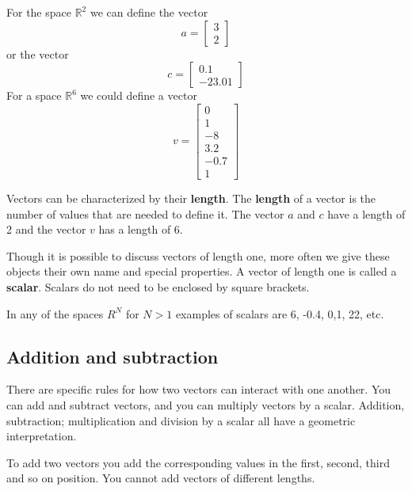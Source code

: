 \ex For the space $\mathbb{R}^{2}$ we can define the vector 
\begin{equation}
    a = \begin{bmatrix}
        3\\
        2
    \end{bmatrix}
\end{equation} or the vector 
\begin{equation}
    c = \begin{bmatrix}
        0.1\\
        -23.01
    \end{bmatrix}
\end{equation}
For a space $\mathbb{R}^{6}$ we could define a vector 
\begin{equation}
    v = \begin{bmatrix}
        0\\
        1\\
        -8\\
        3.2\\
        -0.7\\
        1
    \end{bmatrix}
\end{equation}

Vectors can be characterized by their \textbf{length}.
The \textbf{length} of a vector is the number of values that are needed to define it. The vector $a$ and $c$ have a length of 2 and the vector $v$ has a length of 6.

Though it is possible to discuss vectors of length one, more often we give these objects their own name and special properties. 
A vector of length one is called a \textbf{scalar}. 
Scalars do not need to be enclosed by square brackets.

\ex In any of the spaces $R^{N}$ for $N>1$ examples of scalars are 6, -0.4, 0,1, 22, etc.

\subsection{Addition and subtraction}

There are specific rules for how two vectors can interact with one another.
You can add and subtract vectors, and you can multiply vectors by a scalar. 
Addition, subtraction; multiplication and division by a scalar all have a geometric interpretation.

To add two vectors you add the corresponding values in the first, second, third and so on position.
You cannot add vectors of different lengths. 


